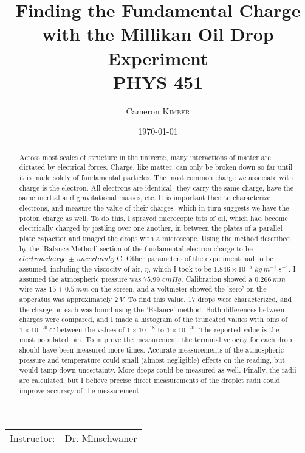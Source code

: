 \documentclass{article}
\title{Finding the Fundamental Charge \\ with the Millikan Oil Drop Experiment\\ PHYS 451} %
\author{Cameron \textsc{Kimber}} %
\date{\today} %
\begin{document}
\maketitle %

\begin{center}
\begin{tabular}{l r}
Instructor: & Dr. Minschwaner %
\end{tabular}
\end{center}

\newcommand{\qel}{electron charge}
\newcommand{\sel}{uncertainty}

\begin{abstract}
Across most scales of structure in the universe, many interactions of matter are dictated
by electrical forces. Charge, like matter, can only be broken down so far until it is
made solely of fundamental particles. The most common charge we associate with charge
is the electron. All electrons are identical- they carry the same charge, have the same
inertial and gravitational masses, etc. It is important then to characterize electrons,
and measure the value of their charges- which in turn suggests we have the proton charge
as well. To do this, I sprayed microcopic bits of oil, which had become electrically
charged by jostling over one another, in between the plates of a parallel plate capacitor
and imaged the drops with a microscope. Using the method described by the 'Balance Method'
section of the fundamental electron charge to be $\qel$ $\pm$ $\sel$ C. Other parameters
of the experiment had to be assumed, including the viscocity of air, $\eta$, which I took to be
$1.846 \times 10^{-5}$ $kg\  m^{-1}\  s^{-1}$. I assumed the atmospheric pressure was
$75.99$ $cmHg$. Calibration showed a $0.266\ mm$ wire was $15 \pm 0.5\ mm$ on the screen,
and a voltmeter showed the 'zero' on the apperatus was approximately $2\ V$. To find this value,
$17$ drops were characterized, and the charge on each was found using the 'Balance' method. Both
differences between charges were compared, and I made a histogram of the truncated values
with bins of $1 \times 10^{-20}\ C$ between the values of $1 \times 10^{-18}$ to $1 \times 10^{-20}$.
The reported value is the most populated bin. To improve the measurement, the terminal
velocity for each drop should have been measured more times. Accurate measurements of the atmospheric
pressure and temperature could small (almost negligible) effects on the reading, but would
tamp down uncertainty. More drops could be measured as well. Finally, the radii are calculated,
but I believe precise direct measurements of the droplet radii could improve accuracy of the measurement.

\end{abstract}
\end{document}
